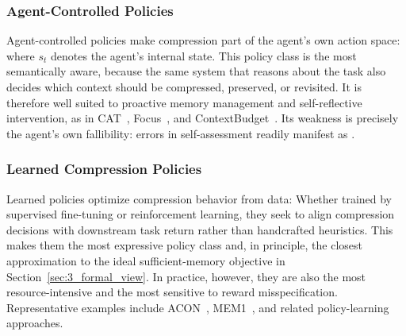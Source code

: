 \subsubsection{Agent-Controlled Policies} 
Agent-controlled policies make compression part of the agent's own action space:
where \(s_t\) denotes the agent's internal state. This policy class is the most semantically aware, because the same system that reasons about the task also decides which context should be compressed, preserved, or revisited. It is therefore well suited to proactive memory management and self-reflective intervention, as in CAT~\citep{liu2025contexttoolcontextmanagement}, Focus~\citep{verma2026activecontextcompressionautonomous}, and ContextBudget~\citep{wu2026contextbudgetbudgetawarecontextmanagement}. Its weakness is precisely the agent's own fallibility: errors in self-assessment readily manifest as \fone.

\subsubsection{Learned Compression Policies} 
Learned policies optimize compression behavior from data:
Whether trained by supervised fine-tuning or reinforcement learning, they seek to align compression decisions with downstream task return rather than handcrafted heuristics. This makes them the most expressive policy class and, in principle, the closest approximation to the ideal sufficient-memory objective in Section~\ref{sec:3_formal_view}. In practice, however, they are also the most resource-intensive and the most sensitive to reward misspecification. Representative examples include ACON~\citep{kang2025aconoptimizingcontextcompression}, MEM1~\citep{zhou2025mem1learningsynergizememory}, and related policy-learning approaches.
